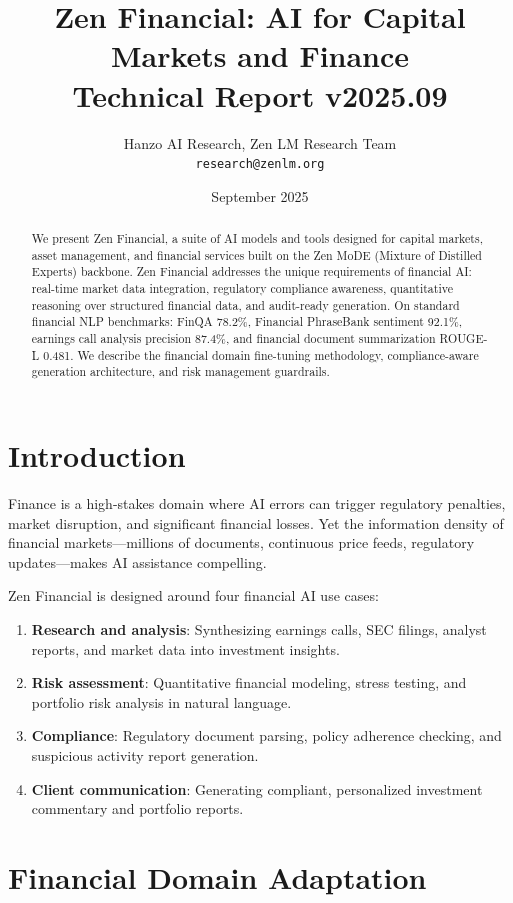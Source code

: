 \documentclass[11pt,a4paper]{article}
\title{\textbf{Zen Financial: AI for Capital Markets and Finance}\\
\large Technical Report v2025.09}
\author{Hanzo AI Research, Zen LM Research Team\\
\texttt{research@zenlm.org}}
\date{September 2025}
\begin{document}
\maketitle

\begin{abstract}
We present Zen Financial, a suite of AI models and tools designed for capital markets, asset management, and financial services built on the Zen MoDE (Mixture of Distilled Experts) backbone. Zen Financial addresses the unique requirements of financial AI: real-time market data integration, regulatory compliance awareness, quantitative reasoning over structured financial data, and audit-ready generation. On standard financial NLP benchmarks: FinQA 78.2\%, Financial PhraseBank sentiment 92.1\%, earnings call analysis precision 87.4\%, and financial document summarization ROUGE-L 0.481. We describe the financial domain fine-tuning methodology, compliance-aware generation architecture, and risk management guardrails.
\end{abstract}

\section{Introduction}

Finance is a high-stakes domain where AI errors can trigger regulatory penalties, market disruption, and significant financial losses. Yet the information density of financial markets—millions of documents, continuous price feeds, regulatory updates—makes AI assistance compelling.

Zen Financial is designed around four financial AI use cases:

\begin{enumerate}
  \item \textbf{Research and analysis}: Synthesizing earnings calls, SEC filings, analyst reports, and market data into investment insights.
  \item \textbf{Risk assessment}: Quantitative financial modeling, stress testing, and portfolio risk analysis in natural language.
  \item \textbf{Compliance}: Regulatory document parsing, policy adherence checking, and suspicious activity report generation.
  \item \textbf{Client communication}: Generating compliant, personalized investment commentary and portfolio reports.
\end{enumerate}

\section{Financial Domain Adaptation}
\end{document}
